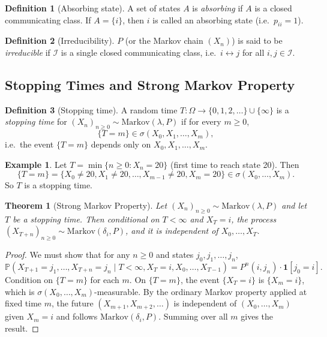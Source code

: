 \documentclass[12pt, a4paper]{article}
\theoremstyle{definition}
\newtheorem{definition}{Definition}[section]
\newtheorem{example}{Example}[section]
\theoremstyle{plain}
\newtheorem{theorem}{Theorem}[section]
\newcommand{\PP}{\mathbb{P}}
\newcommand{\II}{\mathcal{I}}
\begin{document}
\begin{definition}[Absorbing state]
A set of states $A$ is \emph{absorbing} if $A$ is a closed communicating class. If $A = \{i\}$, then $i$ is called an absorbing state (i.e.\ $p_{ii} = 1$).
\end{definition}

\begin{definition}[Irreducibility]
$P$ (or the Markov chain $(X_n)$) is said to be \emph{irreducible} if $\II$ is a single closed communicating class, i.e.\ $i \leftrightarrow j$ for all $i, j \in \II$.
\end{definition}

\subsection{Stopping Times and Strong Markov Property}

\begin{definition}[Stopping time]
A random time $T : \Omega \to \{0,1,2,\ldots\} \cup \{\infty\}$ is a \emph{stopping time} for $(X_n)_{n \ge 0} \sim \text{Markov}(\lambda, P)$ if for every $m \ge 0$,
\begin{equation*}
  \{T = m\} \in \sigma(X_0, X_1, \ldots, X_m),
\end{equation*}
i.e.\ the event $\{T = m\}$ depends only on $X_0, X_1, \ldots, X_m$.
\end{definition}

\begin{example}
Let $T = \min\{n \ge 0 : X_n = 20\}$ (first time to reach state 20). Then
\begin{equation*}
  \{T = m\} = \{X_0 \neq 20, X_1 \neq 20, \ldots, X_{m-1} \neq 20, X_m = 20\} \in \sigma(X_0, \ldots, X_m).
\end{equation*}
So $T$ is a stopping time.
\end{example}

\begin{theorem}[Strong Markov Property]
Let $(X_n)_{n \ge 0} \sim \text{Markov}(\lambda, P)$ and let $T$ be a stopping time. Then conditional on $T < \infty$ and $X_T = i$, the process $(X_{T+n})_{n \ge 0} \sim \text{Markov}(\delta_i, P)$, and it is independent of $X_0, \ldots, X_T$.
\end{theorem}


\begin{proof}
We must show that for any $n \ge 0$ and states $j_0, j_1, \ldots, j_n$,
\begin{equation*}
  \PP(X_{T+1}=j_1,\ldots,X_{T+n}=j_n \mid T < \infty, X_T = i, X_0,\ldots,X_{T-1})
  = P^n(i, j_n)\cdot\mathbf{1}[j_0 = i].
\end{equation*}
Condition on $\{T = m\}$ for each $m$. On $\{T = m\}$, the event $\{X_T = i\}$ is $\{X_m = i\}$, which is $\sigma(X_0,\ldots,X_m)$-measurable. By the ordinary Markov property applied at fixed time $m$, the future $(X_{m+1}, X_{m+2}, \ldots)$ is independent of $(X_0, \ldots, X_m)$ given $X_m = i$ and follows $\text{Markov}(\delta_i, P)$. Summing over all $m$ gives the result.
\end{proof}
\end{document}
